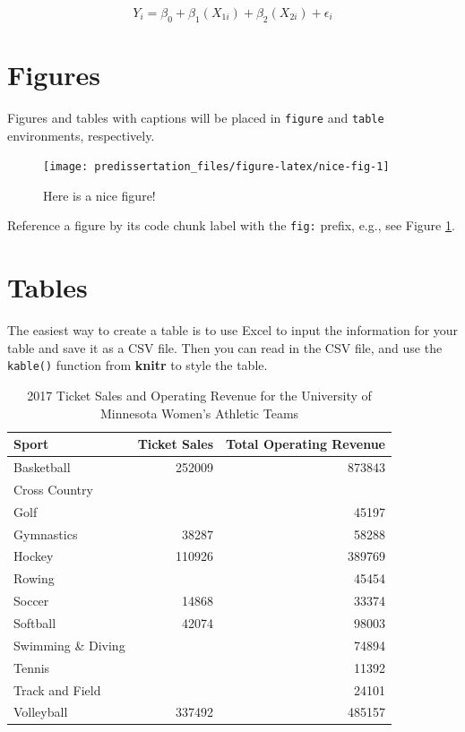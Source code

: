 \documentclass[12pt,letterpaper,oneside,oldfontcommands]{memoir}
\theoremstyle{definition}
\theoremstyle{definition}
\theoremstyle{definition}
\theoremstyle{remark}
\begin{document}
\begin{equation}
Y_i = \beta_0 + \beta_1(X_{1i}) + \beta_2(X_{2i}) + \epsilon_i
\end{equation}

\hypertarget{figures}{%
\section{Figures}\label{figures}}

Figures and tables with captions will be placed in \texttt{figure} and
\texttt{table} environments, respectively.

\begin{figure}[H]

{\centering \texttt{[image: predissertation\_files/figure-latex/nice-fig-1]} 

}

\caption{Here is a nice figure!}\label{fig:nice-fig}
\end{figure}

Reference a figure by its code chunk label with the \texttt{fig:}
prefix, e.g., see Figure \ref{fig:nice-fig}.

\hypertarget{tables}{%
\section{Tables}\label{tables}}

The easiest way to create a table is to use Excel to input the
information for your table and save it as a CSV file. Then you can read
in the CSV file, and use the \texttt{kable()} function from
\textbf{knitr} to style the table.

\begin{table}

\caption{\label{tab:nice-tab}2017 Ticket Sales and Operating Revenue for the University of Minnesota Women's Athletic Teams}
\centering
\begin{tabular}[t]{lrr}
\toprule
Sport & Ticket Sales & Total Operating Revenue\\
\midrule
Basketball & 252009 & 873843\\
Cross Country &  & \\
Golf &  & 45197\\
Gymnastics & 38287 & 58288\\
Hockey & 110926 & 389769\\
\addlinespace
Rowing &  & 45454\\
Soccer & 14868 & 33374\\
Softball & 42074 & 98003\\
Swimming \& Diving &  & 74894\\
Tennis &  & 11392\\
\addlinespace
Track and Field &  & 24101\\
Volleyball & 337492 & 485157\\
\bottomrule
\end{tabular}
\end{table}
\end{document}
